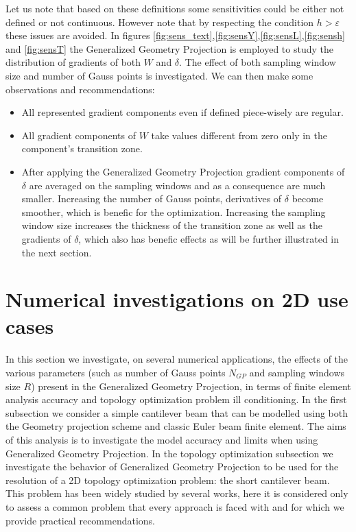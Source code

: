 Let us note that based on these definitions some sensitivities could be either not defined or not continuous. However note that by respecting the condition $h>\varepsilon$ these issues are avoided. In figures \ref{fig:sens_text},\ref{fig:sensY},\ref{fig:sensL},\ref{fig:sensh} and \ref{fig:sensT} the Generalized Geometry Projection is employed to study the distribution of gradients of both $W$ and $\delta$. The effect of both sampling window size and number of Gauss points is investigated. We can then make some observations and recommendations:
\begin{itemize}
    \item All represented gradient components even if defined piece-wisely are regular.
    \item All gradient components of $W$ take values different from zero only in the component's transition zone. 
    \item After applying the Generalized Geometry Projection gradient components of $\delta$ are averaged on the sampling windows and as a consequence are much smaller. Increasing the number of Gauss points, derivatives of $\delta$ become smoother, which is benefic for the optimization. Increasing the sampling window size increases the thickness of the transition zone as well as the gradients of $\delta$, which also has benefic effects as will be further illustrated in the next section.
\end{itemize}
\section{Numerical investigations on 2D use cases}
\label{I}
In this section we investigate, on several numerical applications, the effects of the various parameters (such as number of Gauss points $N_{GP}$ and sampling windows size $R$) present in the Generalized Geometry Projection, in terms of finite element analysis accuracy and topology optimization problem ill conditioning. In the first subsection we consider a simple cantilever beam that can be modelled using both the Geometry projection scheme and classic Euler beam finite element. The aims of this analysis is to investigate the model accuracy and limits when using Generalized Geometry Projection. In the topology optimization subsection we investigate the behavior of  Generalized Geometry Projection to be used for the resolution of a 2D topology optimization problem: the short cantilever beam. This problem has been widely studied by several works, here it is considered only to assess a common problem that every approach is faced with and for which we provide practical recommendations.
